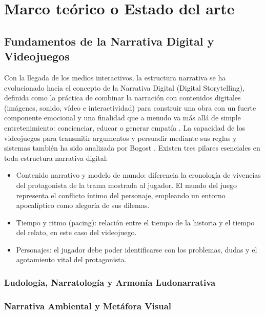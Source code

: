 \chapter{Marco teórico o Estado del arte}
\label{cap:estado}

\section{Fundamentos de la Narrativa Digital y Videojuegos}
Con la llegada de los medios interactivos, la estructura narrativa se ha evolucionado hacia el concepto de la Narrativa Digital (Digital Storytelling), definida como la práctica de combinar la narración con contenidos digitales (imágenes, sonido, vídeo e interactividad) para construir una obra con un fuerte componente emocional y una finalidad que a menudo va más allá de simple entretenimiento: concienciar, educar o generar empatía \parencite{navarro2023}.
La capacidad de los videojuegos para transmitir argumentos y persuadir mediante sus reglas y sistemas también ha sido analizada por Bogost \parencite{bogost2011}.
Existen tres pilares esenciales en toda estructura narrativa digital:
\begin{itemize}
  \item Contenido narrativo y modelo de mundo: diferencia la cronología de vivencias del protagonista de la trama mostrada al jugador. El mundo del juego representa el conflicto íntimo del personaje, empleando un entorno apocalíptico como alegoría de sus dilemas.
  \item Tiempo y ritmo (pacing): relación entre el tiempo de la historia y el tiempo del relato, en este caso del videojuego.
  \item Personajes: el jugador debe poder identificarse con los problemas, dudas y el agotamiento vital del protagonista.
\end{itemize}

\subsection{Ludología, Narratología y Armonía Ludonarrativa}
\subsection{Narrativa Ambiental y Metáfora Visual}
